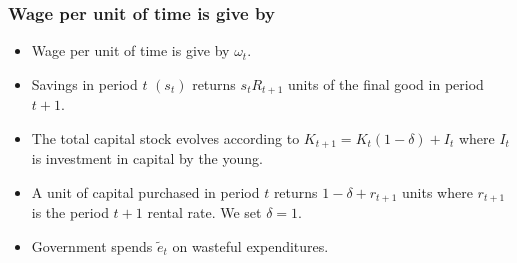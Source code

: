 \documentclass[aspectratio=169]{ltx-talk}
\begin{document}
\begin{frame}
\frametitle{Wage per unit of time is give by}
\begin{itemize}
\item Wage per unit of time is give by $\omega _{t}$.

\item Savings in period $t$ $(s_{t})$ returns $s_{t}R_{t+1}$ units of the
final good in period $t+1.$

\item The total capital stock evolves according to $K_{t+1}=K_{t}\left(
1-\delta \right) +I_{t}$ where $I_{t}$ is investment in capital by the young.

\item A unit of capital purchased in period $t$ returns $1-\delta +r_{t+1}$
units where $r_{t+1}$ is the period $t+1$ rental rate. We set $\delta =1.$

\item Government spends $\tilde{e}_{t}$ on wasteful expenditures.
\end{itemize}
\end{frame}
\end{document}
